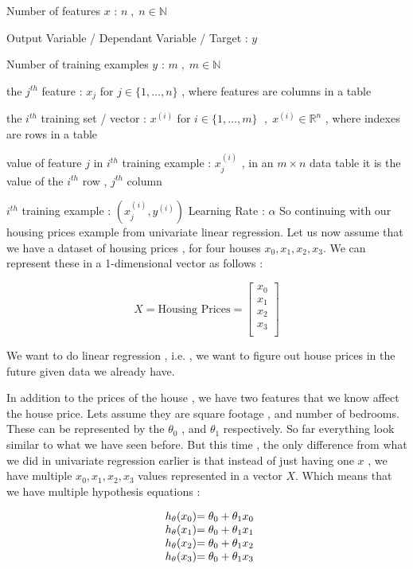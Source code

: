  Number of features $x$ : $ n\; , \; n \in \mathbb{N} $ 

 Output Variable / Dependant Variable / Target : $ y\; $ 

 Number of training examples $y$ : $ m  \; , \; m \in \mathbb{N} $ 

  the $j^{th}$ feature : $ x_{j} $ for $ j \in \{1 , \ldots , n\} $ , where features are columns in a table

  the $i^{th}$ training set / vector : $x^{(i)}$  for $ i \in \{1 , \ldots , m\} $ $\; , \;  x^{(i)} \in \mathbb{R}^{n} $
 , where indexes are rows in a table

  value of feature $j$ in $i^{th}$ training example : $ x_{j}^{(i)} $ , 
 in an $ m \times n$ data table it is the value of the $i^{th}$ row , $j^{th}$ column 

 $i^{th}$ training example : $ ( x_{j}^{(i)} , y^{(i)} ) $ 
 Learning Rate : \( \alpha \) 
So continuing with our housing prices example from univariate linear regression.
Let us now assume that we have a dataset of housing prices , for four houses
\(x_0, x_1 , x_2 , x_3 \). We can represent these in a 1-dimensional vector as
follows :

\[
X =
\text{Housing Prices}  =
\begin{bmatrix}
	x_0 \\
	x_1 \\
	x_2 \\
	x_3 \\
\end{bmatrix}
\]

We want to do linear regression , i.e. , we want to figure out house prices in
the future given data we already have.

In addition to the prices of the house , we have two features that we know
affect the house price. Lets assume they are square footage , and number of
bedrooms. These can be represented by the \( \theta_0 \) , and \( \theta_1 \)
respectively. So far everything look similar to what we have seen before. But
this time , the only difference from what we did in univariate regression
earlier is that instead of just having one \( x \) , we have multiple \(x_0, x_1
	, x_2 , x_3 \) values represented in a vector \( X \). Which means that we
have multiple hypothesis equations :

\[
	\begin{array}{ l@{} l@{} }
		h_{\theta}(x_0) &= \theta_{0} + \theta_{1}x_0  \\
		h_{\theta}(x_1) &= \theta_{0} + \theta_{1}x_1  \\
		h_{\theta}(x_2) &= \theta_{0} + \theta_{1}x_2  \\
		h_{\theta}(x_3) &= \theta_{0} + \theta_{1}x_3  \\
	\end{array}
\]

